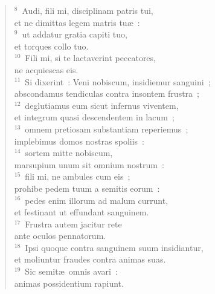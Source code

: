 \begin{flushleft}\begin{verse}${}^{8}$~Audi, fili mi, disciplinam patris tui,\\ et ne dimittas legem matris tu\ae~:\\
${}^{9}$~ut addatur gratia capiti tuo,\\ et torques collo tuo.\\
${}^{10}$~Fili mi, si te lactaverint peccatores,\\ ne acquiescas eis.\\
${}^{11}$~Si dixerint~: Veni nobiscum, insidiemur sanguini~;\\ abscondamus tendiculas contra insontem frustra~;\\
${}^{12}$~deglutiamus eum sicut infernus viventem,\\ et integrum quasi descendentem in lacum~;\\
${}^{13}$~omnem pretiosam substantiam reperiemus~;\\ implebimus domos nostras spoliis~:\\
${}^{14}$~sortem mitte nobiscum,\\ marsupium unum sit omnium nostrum~:\\
${}^{15}$~fili mi, ne ambules cum eis~;\\ prohibe pedem tuum a semitis eorum~:\\
${}^{16}$~pedes enim illorum ad malum currunt,\\ et festinant ut effundant sanguinem.\\
${}^{17}$~Frustra autem jacitur rete\\ ante oculos pennatorum.\\
${}^{18}$~Ipsi quoque contra sanguinem suum insidiantur,\\ et moliuntur fraudes contra animas suas.\\
${}^{19}$~Sic semit\ae\ omnis avari~:\\ animas possidentium rapiunt.\end{verse}\end{flushleft}


